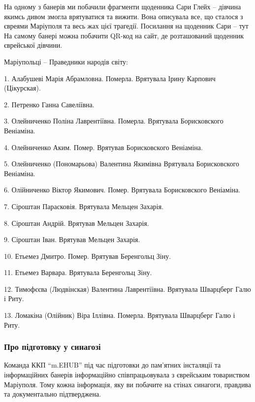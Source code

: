
На одному з банерів ми побачили фрагменти щоденника Сари Глейх – дівчина якимсь
дивом змогла врятуватися та вижити. Вона описувала все, що сталося з євреями
Маріуполя та весь жах цієї трагедії. Посилання на щоденник Сари – тут На самому
банері можна побачити QR-код на сайт, де розташований щоденник єврейської
дівчини.


Маріупольці – Праведники народів світу:

1. Алабушеві Марія Абрамловна. Померла. Врятувала Ірину Карпович (Цікурская).\par
2. Петренко Ганна Савеліївна.\par
3. Олейниченко Поліна Лаврентіївна. Померла. Врятувала Борисковского Веніаміна.\par
4. Олейниченко Аким. Помер. Врятував Борисковского Веніаміна.\par
5. Олейниченко (Пономарьова) Валентина Якимівна Врятувала Борисковского Веніаміна.\par
6. Олійниченко Віктор Якимович. Помер. Врятувала Борисковского Веніаміна.\par
7. Сіроштан Парасковія. Врятувала Мельцен Захарія.\par
8. Сіроштан Андрій. Врятував Мельцен Захарія.\par
9. Сіроштан Іван. Врятував Мельцен Захарія.\par
10. Етьемез Дмитро. Помер. Врятував Беренгольц Зіну.\par
11. Етьемез Варвара. Врятувала Беренгольц Зіну.\par
12. Тимофєєва (Людвінская) Валентина Лаврентіївна. Врятувала Шварцберг Галю і Риту.\par
13. Ломакіна (Олійник) Віра Іллівна. Померла. Врятувала Шварцберг Галю і Риту.\par


\subsubsection{Про підготовку у синагозі}

Команда ККП \enquote{m.EHUB} під час підготовки до пам'ятних інсталяції та
інформаційних банерів інформаційно співпрацьовувала з єврейським товариством
Маріуполя. Тому кожна інформація, яку ви побачите на стінах синагоги, правдива
та документально підтверджена.

